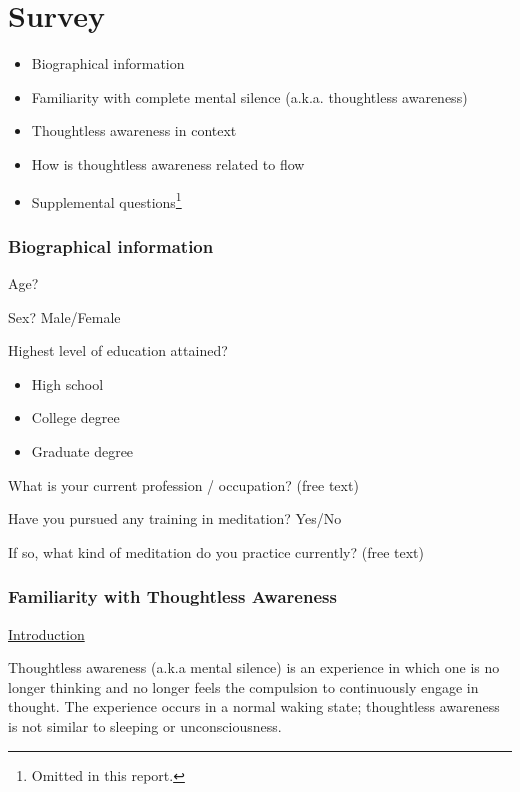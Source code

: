 \documentclass[10pt,utf8x]{beamer}
\begin{document}
\section{Survey}
\begin{frame}
\begin{itemize}
\item Biographical information
\item Familiarity with complete mental silence (a.k.a. thoughtless awareness)
\item Thoughtless awareness in context
\item How is thoughtless awareness related to flow
\item Supplemental questions\footnote{Omitted in this report.}
\end{itemize}
\end{frame}

\begin{frame}
  \frametitle{Biographical information}
Age?

Sex? Male/Female

Highest level of education attained?
\begin{itemize}
\item High school
\item College degree
\item Graduate degree
\end{itemize}

What is your current profession / occupation? (free text)

Have you pursued any training in meditation? Yes/No

If so, what kind of meditation do you practice currently? (free text)
\end{frame}

\begin{frame}
  \frametitle{Familiarity with Thoughtless Awareness}
{\Large\ul{Introduction}}

Thoughtless awareness (a.k.a mental silence) is an experience in which
one is no longer thinking and no longer feels the compulsion to
continuously engage in thought. The experience occurs in a normal
waking state; thoughtless awareness is not similar to sleeping or
unconsciousness.

\end{frame}
\end{document}

